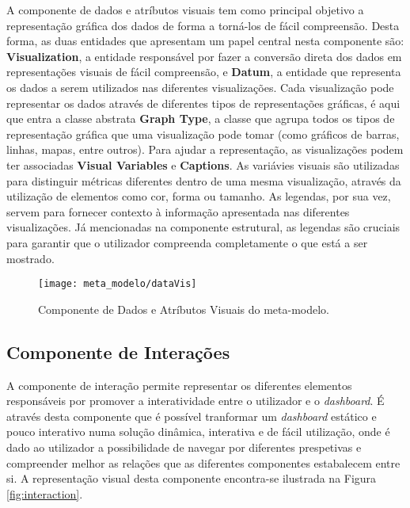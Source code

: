 A componente de dados e atríbutos visuais tem como principal objetivo a representação gráfica dos dados de forma a torná-los de fácil compreensão. Desta forma, as duas entidades que apresentam um papel central nesta componente são: \textbf{Visualization}, a entidade responsável por fazer a conversão direta dos dados em representações visuais de fácil compreensão, e \textbf{Datum}, a entidade que representa os dados a serem utilizados nas diferentes visualizações. Cada visualização pode representar os dados através de diferentes tipos de representações gráficas, é aqui que entra a classe abstrata \textbf{Graph Type}, a classe que agrupa todos os tipos de representação gráfica que uma visualização pode tomar (como gráficos de barras, linhas, mapas, entre outros). Para ajudar a representação, as visualizações podem ter associadas \textbf{Visual Variables} e \textbf{Captions}. As variávies visuais são utilizadas para distinguir métricas diferentes dentro de uma mesma visualização, através da utilização de elementos como cor, forma ou tamanho. As legendas, por sua vez, servem para fornecer contexto à informação apresentada nas diferentes visualizações. Já mencionadas na componente estrutural, as legendas são cruciais para garantir que o utilizador compreenda completamente o que está a ser mostrado.

\begin{figure}[htbp]
  \texttt{[image: meta\_modelo/dataVis]}
  \centering
  \caption{Componente de Dados e Atríbutos Visuais do meta-modelo.}
  \label{fig:comp_data_vis}
\end{figure}

\subsection{Componente de Interações} %
\label{sub:int_diagram}

A componente de interação permite representar os diferentes elementos responsáveis por promover a interatividade entre o utilizador e o \textit{dashboard}. É através desta componente que é possível tranformar um \textit{dashboard} estático e pouco interativo numa solução dinâmica, interativa e de fácil utilização, onde é dado ao utilizador a possibilidade de navegar por diferentes prespetivas e compreender melhor as relações que as diferentes componentes estabalecem entre si. A representação visual desta componente encontra-se ilustrada na Figura \ref{fig:interaction}.

